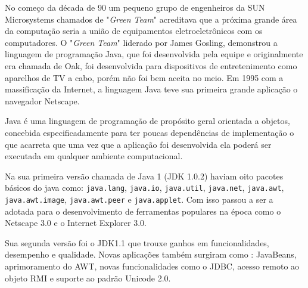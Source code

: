 No começo da d\'{e}cada de 90 um pequeno grupo de engenheiros da SUN Microsystems chamados de "\textit{Green Team}" acreditava que a pr\'{o}xima grande \'{a}rea da computaç\~{a}o seria a uni\~{a}o de equipamentos eletroeletrônicos com os computadores. O "\textit{Green Team}" liderado por James Gosling, demonstrou a linguagem de programaç\~{a}o Java, que foi desenvolvida pela equipe e originalmente era chamada de Oak, foi desenvolvida para dispositivos de entretenimento como aparelhos de TV a cabo, por\'{e}m n\~{a}o foi bem aceita no meio. Em 1995 com a massificaç\~{a}o da Internet, a linguagem Java teve sua primeira grande aplicaç\~{a}o o navegador Netscape.

Java \'{e} uma linguagem de programaç\~{a}o de prop\'{o}sito geral orientada a objetos, concebida especificadamente para ter poucas dependências de implementaç\~{a}o o que acarreta que uma vez que a aplicaç\~{a}o foi desenvolvida ela poder\'{a} ser executada em qualquer ambiente computacional.

Na sua primeira vers\~{a}o chamada de Java 1 (\acs{JDK} 1.0.2) haviam oito pacotes b\'{a}sicos do java como: \texttt{java.lang}, \texttt{java.io}, \texttt{java.util}, \texttt{java.net}, \texttt{java.awt}, \texttt{java.awt.image}, \texttt{java.awt.peer} e \texttt{java.applet}. Com isso passou a ser a adotada para o desenvolvimento de ferramentas populares na \'{e}poca como o Netscape 3.0 e o Internet Explorer 3.0.

Sua segunda vers\~{a}o foi o \acs{JDK}1.1 \cite{JDK1.1} que trouxe ganhos em funcionalidades, desempenho e qualidade. Novas aplicaç\~{o}es tamb\'{e}m surgiram como : JavaBeans, aprimoramento do \acs{AWT}, novas funcionalidades como o \acs{JDBC}, acesso remoto ao objeto \acs{RMI} e suporte ao padr\~{a}o Unicode 2.0.

